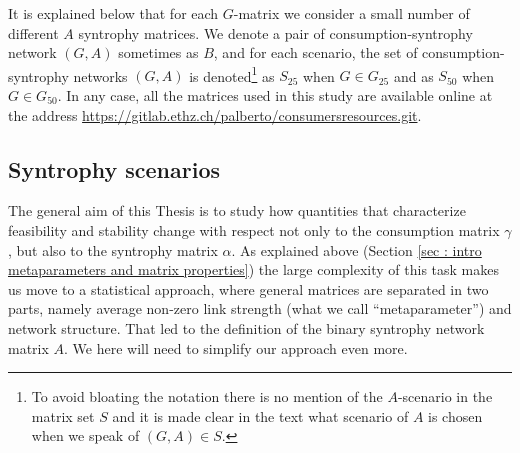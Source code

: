 \documentclass[12pt]{report}
\begin{document}
It is explained below that for each $G$-matrix we consider a small number of different $A$ syntrophy matrices. We denote a pair of consumption-syntrophy network $(G,A)$ sometimes as $B$, and for each scenario, the set of consumption-syntrophy networks $(G,A)$ is denoted\footnote{To avoid bloating the notation there is no mention of the $A$-scenario in the matrix set $S$ and it is made clear in the text what scenario of $A$ is chosen when we speak of $(G,A) \in S$.} as $S_{25}$ when $G \in G_{25}$ and as $S_{50}$ when $G \in G_{50}$.
In any case, all the matrices used in this study are available online at the address \url{https://gitlab.ethz.ch/palberto/consumersresources.git}.

\subsection{Syntrophy scenarios}\label{sec: syntrophy scenarios}
The general aim of this Thesis is to study how quantities that characterize feasibility and stability change with respect not only to the consumption matrix $\gamma$, but also to the syntrophy matrix $\alpha$. As explained above (Section \ref{sec : intro metaparameters and matrix properties}) the large complexity of this task makes us move to a statistical approach, where general matrices are separated in two parts, namely average non-zero link strength (what we call ``metaparameter'') and network structure. That led to the definition of the binary syntrophy network matrix $A$. We here will need to simplify our approach even more.
\end{document}
